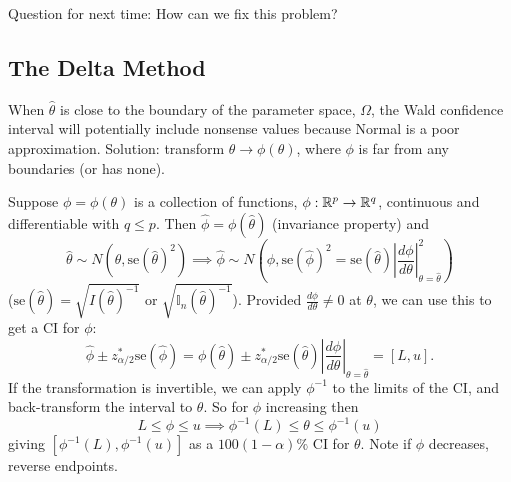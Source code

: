 \documentclass[10pt, a4paper]{article}
\begin{document}
Question for next time:
How can we fix this problem?

\subsection{The Delta Method}
When $\hat{\theta}$ is close to the boundary of the parameter space,
$\Omega$,
the Wald confidence interval will potentially include nonsense values because Normal is a poor approximation.
Solution:
transform $\theta \to \phi(\theta)$,
where $\phi$ is far from any boundaries
(or has none).

\begin{proposition}
    Suppose $\phi = \phi(\theta)$ is a collection of functions,
    $\phi : \mathbb{R} ^ p \to \mathbb{R} ^ q$,
    continuous and differentiable with $q \leq p$.
    Then $\hat{\phi} = \phi(\hat{\theta})$
    (invariance property)
    and
    \[
    \hat{\theta} \sim N(\theta, \mathrm{se}(\hat{\theta}) ^ 2) \implies \hat{\phi} \sim N\left(\phi, \mathrm{se}(\hat{\phi}) ^ 2 = \mathrm{se}(\hat{\theta})\left|\frac{d\phi}{d\theta}\right|_{\theta = \hat{\theta}}^{2}\right)
    \]
    ($\mathrm{se}(\hat{\theta}) = \sqrt{I(\hat{\theta}) ^ {-1}}$ or $\sqrt{\mathbb{I}_n(\hat{\theta}) ^ {-1}}$).
    Provided $\frac{d\phi}{d\theta} \neq 0$ at $\theta$,
    we can use this to get a CI for $\phi$:
    \[
    \hat{\phi} \pm z_{\alpha / 2}^{*}\mathrm{se}(\hat{\phi}) = \phi(\hat{\theta}) \pm z_{\alpha / 2}^{*}\mathrm{se}(\hat{\theta})\left|\frac{d\phi}{d\theta}\right|_{\theta = \hat{\theta}} = [L, u].
    \]
    If the transformation is invertible,
    we can apply $\phi ^ {-1}$ to the limits of the CI,
    and back-transform the interval to $\theta$.
    So for $\phi$ increasing then
    \[
    L \leq \phi \leq u \implies \phi ^ {-1}(L) \leq \theta \leq \phi ^ {-1}(u)
    \]
    giving $[\phi ^ {-1}(L), \phi ^ {-1}(u)]$ as a $100(1 - \alpha)\%$ CI for $\theta$.
    Note if $\phi$ decreases,
    reverse endpoints.
\end{proposition}
\end{document}
